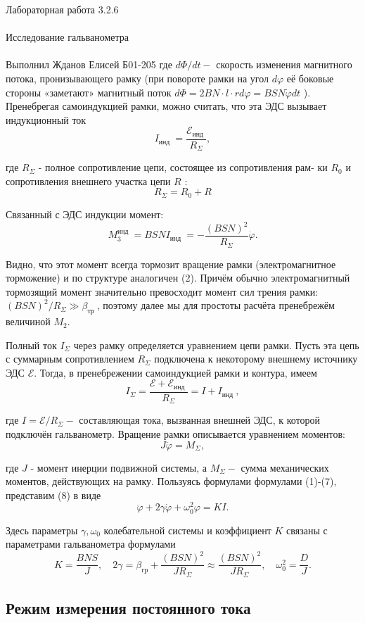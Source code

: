 \documentclass{astroedu-lab}
\begin{document}
\begin{problem}{\huge Лабораторная работа 3.2.6\\\\Исследование гальванометра\\\\Выполнил Жданов Елисей Б01-205}
где $d \Phi / d t-$ скорость изменения магнитного потока, пронизывающего рамку (при повороте рамки на угол $d \varphi$ её боковые стороны «заметают» магнитный поток $d \Phi=2 B N \cdot l \cdot r d \varphi=B S N \dot{\varphi} d t$ ). Пренебрегая самоиндукцией рамки, можно считать, что эта ЭДС вызывает индукционный ток
$$
I_{\text {инд }}=\frac{\mathcal{E}_{\text {инд }}}{R_{\Sigma}},
$$

где $R_{\Sigma}$ - полное сопротивление цепи, состоящее из сопротивления рам-
ки $R_0$ и сопротивления внешнего участка цепи $R$ :
$$
R_{\Sigma}=R_0+R
$$

Связанный с ЭДС индукции момент:
$$
M_3^{\text {инд }}=B S N I_{\text {инд }}=-\frac{(B S N)^2}{R_{\Sigma}} \dot{\varphi} .
$$

Видно, что этот момент всегда тормозит вращение рамки (электромагнитное торможение) и по структуре аналогичен (2). Причём обычно электромагнитный тормозящий момент значительно превосходит момент сил трения рамки: $(B S N)^2 / R_{\Sigma} \gg \beta_{\text {тр }}$, поэтому далее мы для простоты расчёта пренебрежём величиной $M_2$.

Полный ток $I_{\Sigma}$ через рамку определяется уравнением цепи рамки. Пусть эта цепь с суммарным сопротивлением $R_{\Sigma}$ подключена к некоторому внешнему источнику ЭДС $\mathcal{E}$. Тогда, в пренебрежении самоиндукцией рамки и контура, имеем
$$
I_{\Sigma}=\frac{\mathcal{E}+\mathcal{E}_{\text {инд }}}{R_{\Sigma}}=I+I_{\text {инд }},
$$

где $I=\mathcal{E} / R_{\Sigma}-$ составляющая тока, вызванная внешней ЭДС, к которой подключён гальванометр.
Вращение рамки описывается уравнением моментов:
$$
J \ddot{\varphi}=M_{\Sigma},
$$

где $J$ - момент инерции подвижной системы, а $M_{\Sigma}-$ сумма механических моментов, действующих на рамку. Пользуясь формулами формулами (1)-(7), представим (8) в виде
$$
\ddot{\varphi}+2 \gamma \dot{\varphi}+\omega_0^2 \varphi=K I .
$$

Здесь параметры $\gamma, \omega_0$ колебательной системы и коэффициент $K$ связаны с параметрами гальванометра формулами
$$
K=\frac{B N S}{J}, \quad 2 \gamma=\beta_{\mathrm{rp}}+\frac{(B S N)^2}{J R_{\Sigma}} \approx \frac{(B S N)^2}{J R_{\Sigma}}, \quad \omega_0^2=\frac{D}{J} .
$$

\subsection{Режим измерения постоянного тока}


\end{problem}
\end{document}
